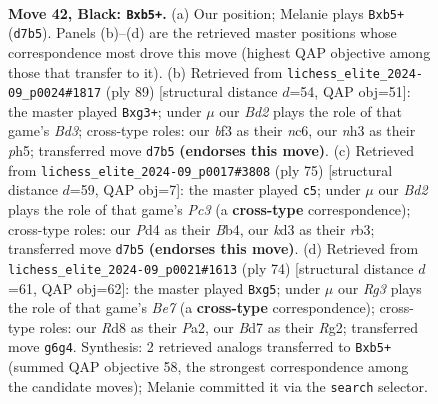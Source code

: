 \documentclass[11pt]{article}
\begin{document}
\clearpage

\begin{figure}[p]\centering
\begin{subfigure}{0.46\textwidth}\centering
\resizebox{\linewidth}{!}{%
\newchessgame
\chessboard[
  setfen={3r2k1/3b1p1p/6r1/pP6/3p2P1/1P1K1B1N/6RP/2R5 b - - 0 42},
  showmover=false,
  pgfstyle=straightmove, color=movearrow, markmove={d7-b5}
]}
\caption{}
\end{subfigure}\hfill
\begin{subfigure}{0.46\textwidth}\centering
\resizebox{\linewidth}{!}{%
\newchessgame
\chessboard[
  setfen={6r1/3r1k2/p1Nb1p1R/1p1P3P/1P6/6P1/5KB1/8 b - - 5 45},
  showmover=false,
  pgfstyle=straightmove, color=movearrow, markmove={d6-g3}
]}
\caption{}
\end{subfigure}
\\[4pt]
\begin{subfigure}{0.46\textwidth}\centering
\resizebox{\linewidth}{!}{%
\newchessgame
\chessboard[
  setfen={4r2k/1r5p/2p2p1B/8/1bP4P/1R2P3/2K2P2/6R1 b - - 12 38},
  showmover=false,
  pgfstyle=straightmove, color=movearrow, markmove={c6-c5}
]}
\caption{}
\end{subfigure}\hfill
\begin{subfigure}{0.46\textwidth}\centering
\resizebox{\linewidth}{!}{%
\newchessgame
\chessboard[
  setfen={6k1/4B3/p1p1p2b/4P1pp/3Pr3/7P/P5RK/8 w - - 0 38},
  showmover=false,
  pgfstyle=straightmove, color=movearrow, markmove={e7-g5}
]}
\caption{}
\end{subfigure}
\caption{\textbf{Move 42, Black: \texttt{Bxb5+}.} (a) Our position; Melanie plays \texttt{Bxb5+} (\texttt{d7b5}). Panels (b)--(d) are the retrieved master positions whose correspondence most drove this move (highest QAP objective among those that transfer to it). (b) Retrieved from \texttt{lichess\_elite\_2024-09\_p0024\#1817} (ply 89) [structural distance $d$=54, QAP obj=51]: the master played \texttt{Bxg3+}; under $\mu$ our \emph{Bd2} plays the role of that game's \emph{Bd3}; cross-type roles: our \emph{b}f3 as their \emph{n}c6, our \emph{n}h3 as their \emph{p}h5; transferred move \texttt{d7b5} \textbf{(endorses this move)}. (c) Retrieved from \texttt{lichess\_elite\_2024-09\_p0017\#3808} (ply 75) [structural distance $d$=59, QAP obj=7]: the master played \texttt{c5}; under $\mu$ our \emph{Bd2} plays the role of that game's \emph{Pc3} (a \textbf{cross-type} correspondence); cross-type roles: our \emph{P}d4 as their \emph{B}b4, our \emph{k}d3 as their \emph{r}b3; transferred move \texttt{d7b5} \textbf{(endorses this move)}. (d) Retrieved from \texttt{lichess\_elite\_2024-09\_p0021\#1613} (ply 74) [structural distance $d$=61, QAP obj=62]: the master played \texttt{Bxg5}; under $\mu$ our \emph{Rg3} plays the role of that game's \emph{Be7} (a \textbf{cross-type} correspondence); cross-type roles: our \emph{R}d8 as their \emph{P}a2, our \emph{B}d7 as their \emph{R}g2; transferred move \texttt{g6g4}. Synthesis: 2 retrieved analogs transferred to \texttt{Bxb5+} (summed QAP objective 58, the strongest correspondence among the candidate moves); Melanie committed it via the \texttt{search} selector.}
\label{fig:thought-m83}
\end{figure}
\end{document}
